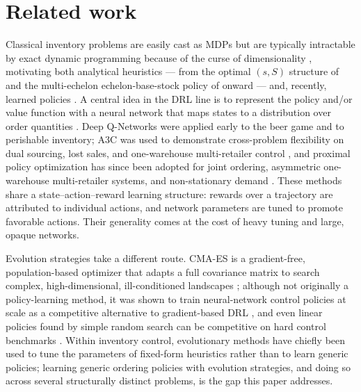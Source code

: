 \documentclass[11pt]{article}
\begin{document}
\section{Related work}
\label{sec:related}

Classical inventory problems are easily cast as MDPs but are typically intractable by exact dynamic
programming because of the curse of dimensionality \citep{powell2011adp}, motivating both analytical
heuristics --- from the optimal $(s,S)$ structure of \citet{scarf1960ss} and the multi-echelon
echelon-base-stock policy of \citet{clarkscarf1960} onward --- and,
recently, learned policies \citep{Zipkin2008OldSystems,Bijvank2011LostSalesReview,boute2022deep}. A
central idea in the DRL line is to represent the policy and/or value function with a neural network
that maps states to a distribution over order quantities \citep{boute2022deep}. Deep Q-Networks were
applied early to the beer game and to perishable inventory; A3C was used to demonstrate cross-problem
flexibility on dual sourcing, lost sales, and one-warehouse multi-retailer control
\citep{gijsbrechts2022drl}, and proximal policy optimization has since been adopted for joint
ordering, asymmetric one-warehouse multi-retailer systems, and non-stationary demand
\citep{kaynov2024owmr}. These methods share a state--action--reward learning structure: rewards over
a trajectory are attributed to individual actions, and network parameters are tuned to promote
favorable actions. Their generality comes at the cost of heavy tuning and large, opaque networks.

Evolution strategies take a different route. CMA-ES is a gradient-free, population-based optimizer
that adapts a full covariance matrix to search complex, high-dimensional, ill-conditioned landscapes
\citep{Hansen2001CompletelyStrategies}; although not originally a policy-learning method, it was
shown to train neural-network control policies at scale as a competitive alternative to gradient-based
DRL \citep{Salimans2017EvolutionLearning}, and even linear policies found by simple random search can
be competitive on hard control benchmarks \citep{mania2018ars}. Within inventory control, evolutionary methods have
chiefly been used to tune the parameters of fixed-form heuristics rather than to learn generic
policies; learning generic ordering policies with evolution strategies, and doing so across several
structurally distinct problems, is the gap this paper addresses.
\end{document}
